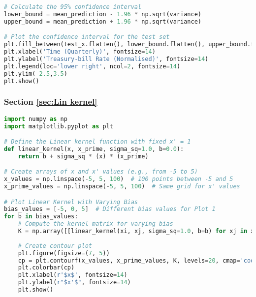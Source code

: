 \documentclass[12pt,a4paper]{article}
\begin{document}
\begin{lstlisting}[language=python, caption={Code of the Creation of Figures \ref{fig:RQ dataset plot} and \ref{fig:RQ GPregression}}]
# Calculate the 95% confidence interval
lower_bound = mean_prediction - 1.96 * np.sqrt(variance)
upper_bound = mean_prediction + 1.96 * np.sqrt(variance)

# Plot the confidence interval for the test set
plt.fill_between(test_x.flatten(), lower_bound.flatten(), upper_bound.flatten(), color='plum', alpha=0.3, label='Confidence Interval (95%)')
plt.xlabel('Time (Quarterly)', fontsize=14)
plt.ylabel('Treasury-bill Rate (Normalised)', fontsize=14)
plt.legend(loc='lower right', ncol=2, fontsize=14)
plt.ylim(-2.5,3.5)
plt.show()
\end{lstlisting}

\subsubsection{Section \ref{sec:Lin kernel}}


\vspace{10pt}
\begin{lstlisting}[language=python, caption={Code of the Creation of Figures \ref{fig:Lin kernel contour plots}}]
import numpy as np
import matplotlib.pyplot as plt

# Define the Linear kernel function with fixed x' = 1
def linear_kernel(x, x_prime, sigma_sq=1.0, b=0.0):
    return b + sigma_sq * (x) * (x_prime)

# Create arrays of x and x' values (e.g., from -5 to 5)
x_values = np.linspace(-5, 5, 100)  # 100 points between -5 and 5
x_prime_values = np.linspace(-5, 5, 100)  # Same grid for x' values

# Plot Linear Kernel with Varying Bias
bias_values = [-5, 0, 5]  # Different bias values for Plot 1
for b in bias_values:
    # Compute the kernel matrix for varying bias
    K = np.array([[linear_kernel(xi, xj, sigma_sq=1.0, b=b) for xj in x_prime_values] for xi in x_values])
    
    # Create contour plot
    plt.figure(figsize=(7, 5))
    cp = plt.contourf(x_values, x_prime_values, K, levels=20, cmap='coolwarm')
    plt.colorbar(cp)
    plt.xlabel(r'$x$', fontsize=14)
    plt.ylabel(r"$x'$", fontsize=14)
    plt.show()
\end{lstlisting}
\end{document}
